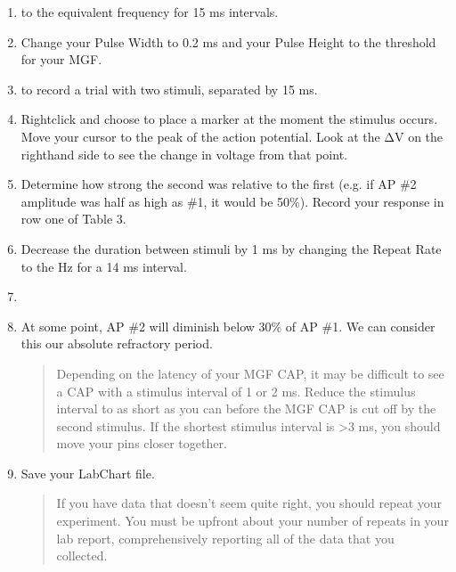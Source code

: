 \documentclass[letterpaper,10pt,english]{jupyterBook}
\begin{document}
\begin{enumerate}
%
\setcounter{enumi}{4}
\item {} 
\sphinxAtStartPar
{} to the equivalent frequency for 15 ms intervals.

\item {} 
\sphinxAtStartPar
Change your Pulse Width to 0.2 ms and your Pulse Height to the threshold for your MGF.

\item {} 
\sphinxAtStartPar
{} to record a trial with two stimuli, separated by 15 ms.

\item {} 
\sphinxAtStartPar
Right\sphinxhyphen{}click and choose  to place a marker at the moment the stimulus occurs. Move your cursor to the peak of the action potential. Look at the ΔV on the right\sphinxhyphen{}hand side to see the change in voltage from that point.

\item {} 
\sphinxAtStartPar
{} Determine how strong the second was relative to the first (e.g. if AP \#2 amplitude was half as high as \#1, it would be 50\%). Record your response in row one of Table 3.

\item {} 
\sphinxAtStartPar
Decrease the duration between stimuli by 1 ms by changing the Repeat Rate to the Hz for a 14 ms interval.

\item {} 
\sphinxAtStartPar
{}

\item {} 
\sphinxAtStartPar
At some point, AP \#2 will diminish below 30\% of AP \#1. We can consider this our absolute refractory period.
\begin{quote}

\sphinxAtStartPar
{} Depending on the latency of your MGF CAP, it may be difficult to see a CAP with a stimulus interval of 1 or 2 ms. Reduce the stimulus interval to as short as you can before the MGF CAP is cut off by the second stimulus. If the shortest stimulus interval is >3 ms, you should move your pins closer together.
\end{quote}

\item {} 
\sphinxAtStartPar
Save your LabChart file.
\begin{quote}

\sphinxAtStartPar
{} If you have data that doesn’t seem quite right, you should repeat your experiment. You must be upfront about your number of repeats in your lab report, comprehensively reporting all of the data that you collected.
\end{quote}

\end{enumerate}
\end{document}
